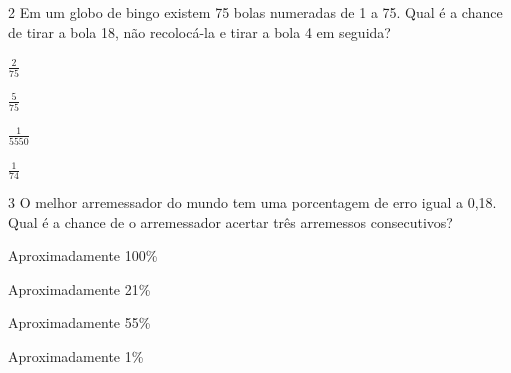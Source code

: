 \num{2} Em um globo de bingo existem 75 bolas numeradas de 1 a 75. Qual é a
chance de tirar a bola 18, não recolocá-la e tirar a bola 4 em seguida?

\begin{escolha}[itemsep=0pt]
\item $\frac{2}{75}$
\item $\frac{5}{75}$
\item $\frac{1}{5550}$
\item $\frac{1}{74}$
\end{escolha}



\num{3} O melhor arremessador do mundo tem uma porcentagem de erro igual a
0,18. Qual é a chance de o arremessador acertar três arremessos
consecutivos?

\begin{escolha}[itemsep=0pt]
\item Aproximadamente 100\%
\item Aproximadamente 21\%
\item Aproximadamente 55\%
\item Aproximadamente 1\%
\end{escolha}


